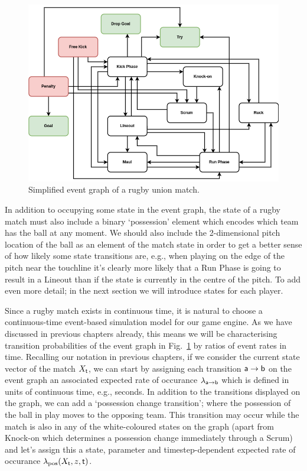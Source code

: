 \begin{figure}[h]
\includegraphics[width=14cm]{images/trywizard-event-graph.drawio.png}
\caption{Simplified event graph of a rugby union match.}
\label{fig:event-graph}
\end{figure}

In addition to occupying some state in the event graph, the state of a rugby match must also include a binary `possession' element which encodes which team has the ball at any moment. We should also include the 2-dimensional pitch location of the ball as an element of the match state in order to get a better sense of how likely some state transitions are, e.g., when playing on the edge of the pitch near the touchline it's clearly more likely that a {\sf Run Phase} is going to result in a {\sf Lineout} than if the state is currently in the centre of the pitch. To add even more detail; in the next section we will introduce states for each player.

Since a rugby match exists in continuous time, it is natural to choose a continuous-time event-based simulation model for our game engine. As we have discussed in previous chapters already, this means we will be characterising transition probabilities of the event graph in Fig.~\ref{fig:event-graph} by ratios of event rates in time. Recalling our notation in previous chapters, if we consider the current state vector of the match $X_{\sf t}$, we can start by assigning each transition ${\sf a}\rightarrow {\sf b}$ on the event graph an associated expected rate of occurance $\lambda_{{\sf a}\rightarrow {\sf b}}$ which is defined in units of continuous time, e.g., seconds. In addition to the transitions displayed on the graph, we can add a `possession change transition'; where the possession of the ball in play moves to the opposing team. This transition may occur while the match is also in any of the white-coloured states on the graph (apart from {\sf Knock-on} which determines a possession change immediately through a {\sf Scrum}) and let's assign this a state, parameter and timestep-dependent expected rate of occurance $\lambda_{\rm pos}(X_{\sf t}, z, {\sf t})$.

